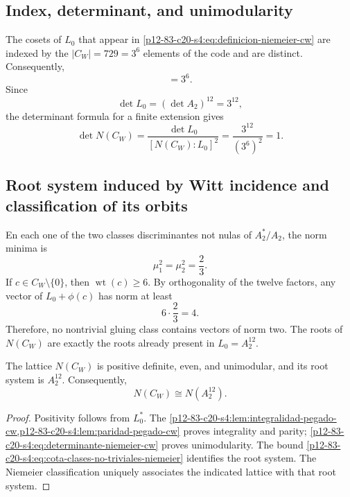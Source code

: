 \subsection{Index, determinant, and unimodularity}

The cosets of \(L_0\) that appear in
\eqref{p12-83-c20-s4:eq:definicion-niemeier-cw} are indexed by the
\(|C_W|=729=3^6\) elements of the code and are distinct. Consequently,
\begin{equation}
 [N(C_W):L_0]=3^6.
 \label{p12-83-c20-s4:eq:indice-niemeier-sobre-a2-doce}
\end{equation}
Since
\[
 \det L_0=(\det A_2)^{12}=3^{12},
\]
the determinant formula for a finite extension gives
\begin{equation}
 \det N(C_W)
 =\frac{\det L_0}{[N(C_W):L_0]^2}
 =\frac{3^{12}}{(3^6)^2}=1.
 \label{p12-83-c20-s4:eq:determinante-niemeier-cw}
\end{equation}

\subsection{Root system induced by Witt incidence and classification of its orbits}

En each one of the two classes discriminantes not nulas of
\(A_2^*/A_2\), the norm minima is
\[
 \mu_1^2=\mu_2^2=\frac23.
\]
If \(c\in C_W\setminus\{0\}\), then
\(\operatorname{wt}(c)\geq6\). By orthogonality of the twelve factors,
any vector of \(L_0+\phi(c)\) has norm at least
\begin{equation}
 6\cdot\frac23=4.
 \label{p12-83-c20-s4:eq:cota-clases-no-triviales-niemeier}
\end{equation}
Therefore, no nontrivial gluing class contains vectors of norm
two. The roots of \(N(C_W)\) are exactly the roots already present in
\(L_0=A_2^{12}\).

\begin{theorem}
\label{p12-83-c20-s4:thm:niemeier-a2-doce-autonomo}
The lattice \(N(C_W)\) is positive definite, even, and unimodular, and its root
system is \(A_2^{12}\). Consequently,
\begin{equation}
 \boxed{N(C_W)\cong N(A_2^{12}).}
 \label{p12-83-c20-s4:eq:identificacion-niemeier-a2-doce}
\end{equation}
\end{theorem}

\begin{proof}
Positivity follows from \(L_0^*\). The
\cref{p12-83-c20-s4:lem:integralidad-pegado-cw,p12-83-c20-s4:lem:paridad-pegado-cw} proves
integrality and parity; \eqref{p12-83-c20-s4:eq:determinante-niemeier-cw} proves
unimodularity. The bound \eqref{p12-83-c20-s4:eq:cota-clases-no-triviales-niemeier}
identifies the root system. The Niemeier classification uniquely associates
the indicated lattice with that root system.
\end{proof}

